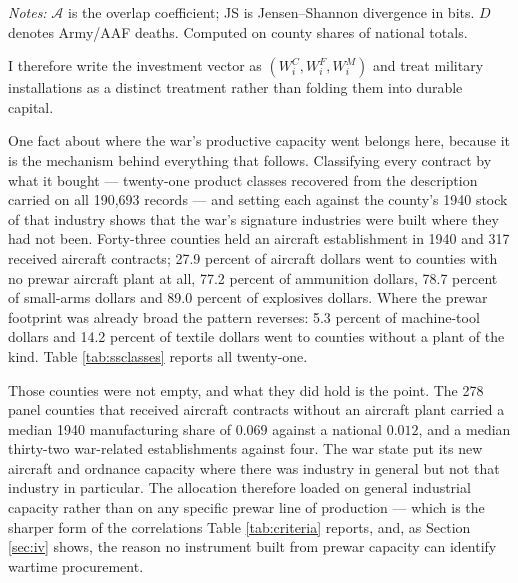 \documentclass[12pt]{article}
\newcommand{\fittab}[1]{%
  \sbox{\tabbox}{#1}%
  \ifdim\wd\tabbox>\textwidth
    \resizebox{\textwidth}{!}{\usebox{\tabbox}}%
  \else\usebox{\tabbox}\fi}
\begin{document}
\begin{table}[htbp]
\centering
\caption{Pairwise geography of the four wartime allocations}
\label{tab:geography}
\fittab{}
\vspace{2pt}
\begin{minipage}{\textwidth}\footnotesize \textit{Notes:} $\mathcal{A}$ is the overlap coefficient; JS is Jensen--Shannon divergence in bits. $D$ denotes Army/AAF deaths. Computed on county shares of national totals.\end{minipage}
\end{table}
 I therefore write the investment vector
as $(W_i^{C}, W_i^{F}, W_i^{M})$ and treat military installations as a distinct
treatment rather than folding them into durable capital.

One fact about where the war's productive capacity went belongs here, because it
is the mechanism behind everything that follows. Classifying every contract by
what it bought --- twenty-one product classes recovered from the description
carried on all 190{,}693 records --- and setting each against the county's 1940
stock of that industry shows that the war's signature industries were built where
they had not been. Forty-three counties held an aircraft establishment in 1940
and 317 received aircraft contracts; 27.9 percent of aircraft dollars went to
counties with no prewar aircraft plant at all, 77.2 percent of ammunition
dollars, 78.7 percent of small-arms dollars and 89.0 percent of explosives
dollars. Where the prewar footprint was already broad the pattern reverses: 5.3
percent of machine-tool dollars and 14.2 percent of textile dollars went to
counties without a plant of the kind. Table \ref{tab:ssclasses} reports all
twenty-one.

Those counties were not empty, and what they did hold is the point. The 278
panel counties that received aircraft contracts without an aircraft plant carried
a median 1940 manufacturing share of $0.069$ against a national $0.012$, and a
median thirty-two war-related establishments against four. The war state put
its new aircraft and ordnance capacity where there was industry in general but
not that industry in particular. The allocation therefore loaded on general
industrial capacity rather than on any specific prewar line of production ---
which is the sharper form of the correlations Table \ref{tab:criteria} reports,
and, as Section \ref{sec:iv} shows, the reason no instrument built from prewar
capacity can identify wartime procurement.
\end{document}
